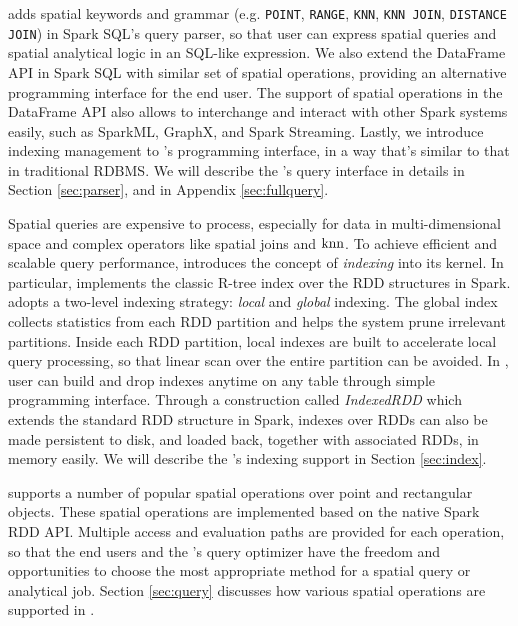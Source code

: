 \name adds spatial
keywords and grammar (e.g. \texttt{POINT}, \texttt{RANGE},
\texttt{KNN}, \texttt{KNN JOIN}, \texttt{DISTANCE JOIN}) in Spark
SQL's query parser, so that user can express spatial queries and
spatial analytical logic in an SQL-like expression. We also extend the
DataFrame API in Spark SQL with similar set of spatial operations,
providing an alternative programming interface for the end user. The
support of spatial operations in the DataFrame API also allows \name
to interchange and interact with other Spark systems easily, such as
SparkML, GraphX, and Spark Streaming. Lastly, we introduce indexing
management to \name's programming interface, in a way that's similar
to that in traditional RDBMS. We will describe the \name's query
interface in details in Section \ref{sec:parser}, and in Appendix
\ref{sec:fullquery}.

 Spatial queries are expensive to process,
especially for data in multi-dimensional space and complex operators
like spatial joins and $\operatorname{knn}$. To achieve efficient and scalable query
performance, \name introduces the concept of {\em indexing} into its
kernel. In particular, \name implements the classic R-tree index
\cite{rtree,DBLP:conf/sigmod/BeckmannKSS90} over the RDD structures in
Spark. \name adopts a two-level indexing strategy: \emph{local} and
\emph{global} indexing. The global index collects statistics from each
RDD partition and helps the system prune irrelevant partitions. Inside
each RDD partition, local indexes are built to accelerate local query
processing, so that linear scan over the entire partition can be
avoided. In \name, user can build and drop indexes anytime on
any table through simple programming interface. Through a construction
called {\em IndexedRDD} which extends the standard RDD structure in
Spark, indexes over RDDs can also be made persistent to disk, and
loaded back, together with associated RDDs, in memory easily. We will
describe the \name's indexing support in Section \ref{sec:index}.

 \name supports a number of popular
spatial operations over point and rectangular objects. These spatial
operations are implemented based on the native Spark RDD API. Multiple
access and evaluation paths are provided for each operation, so that
the end users and the \name's query optimizer have the freedom and
opportunities to choose the most appropriate method for a spatial
query or analytical job. Section \ref{sec:query} discusses how various
spatial operations are supported in \name.

